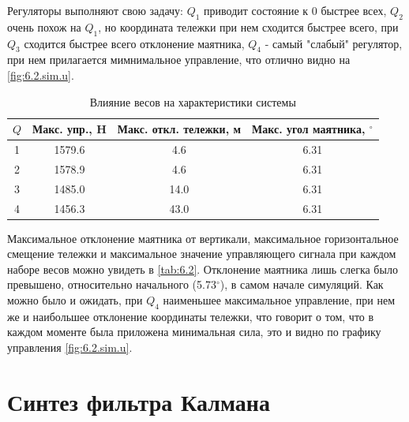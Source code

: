\noindent Регуляторы выполняют свою задачу: $Q_1$ приводит состояние к 0
быстрее всех, $Q_2$ очень похож на $Q_1$, но координата тележки при нем 
сходится быстрее всего, при $Q_3$ сходится быстрее всего отклонение маятника,
$Q_4$ - самый "слабый" регулятор, при нем прилагается мимнимальное управление, что
отлично видно на \autoref{fig:6.2.sim.u}. 

\begin{table}[H]
    \centering
    \caption{\label{tab:6.2}Влияние весов на характеристики системы}
    \begin{tabular}{|c|c|c|c|}
        \hline
        $Q$ & Макс. упр., H & Макс. откл. тележки, м & Макс. угол маятника, $^\circ$ \\
        \hline
        1 & 1579.6   & 4.6  & 6.31   \\
        2    & 1578.9   & 4.6  & 6.31   \\
        3    & 1485.0  & 14.0  & 6.31  \\
        4    & 1456.3  & 43.0  & 6.31  \\
        \hline
    \end{tabular}
\end{table}

\noindent Максимальное отклонение маятника от вертикали,
максимальное горизонтальное смещение тележки и 
максимальное значение управляющего сигнала при каждом наборе весов
можно увидеть в \autoref{tab:6.2}. Отклонение маятника лишь слегка
было превышено, относительно начального (5.73$^\circ$), в самом начале
симуляций. Как можно было и ожидать, при $Q_4$ наименьшее максимальное
управление, при нем же и наибольшее отклонение координаты тележки, что
говорит о том, что в каждом моменте была приложена минимальная сила,
это и видно по графику управления \ref{fig:6.2.sim.u}.

\section{Синтез фильтра Калмана}

